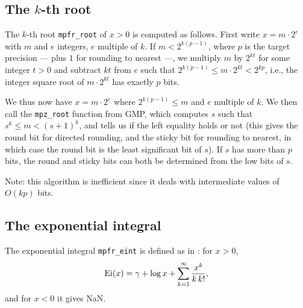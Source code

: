 \documentclass[12pt]{amsart}
\begin{document}
\subsection{The $k$-th root}

The $k$-th root \texttt{mpfr\_root}
of $x > 0$ is computed as follows. First write
$x = m \cdot 2^e$ with $m$ and $e$ integers, $e$ multiple of $k$.
If $m < 2^{k(p-1)}$, where $p$ is the target precision --- plus $1$ for
rounding to nearest ---, we multiply
$m$ by $2^{k t}$ for some integer $t > 0$ and subtract $k t$ from $e$ such that
$2^{k(p-1)} \leq m \cdot 2^{k t} < 2^{kp}$, i.e., the integer square root of
$m \cdot 2^{k t}$ has exactly $p$ bits.

We thus now have $x = m \cdot 2^e$ where $2^{k(p-1)} \leq m$ and $e$
multiple of $k$. We then call the \texttt{mpz\_root} function from GMP,
which computes $s$ such that $s^k \leq m < (s+1)^k$, and tells us if the
left equality holds or not (this gives the round bit for directed rounding,
and the sticky bit for rounding to nearest, in which case the round bit is the
least significant bit of $s$). If $s$ has more than $p$ bits, the round and
sticky bits can both be determined from the low bits of $s$.

Note: this algorithm is inefficient since it deals with intermediate values of
$O(k p)$ bits.

\subsection{The exponential integral}

The exponential integral \verb|mpfr_eint| is defined as in
\cite[formula 5.1.10]{AbSt73}: for $x > 0$,
\[ {\rm Ei}(x) = \gamma + \log x + \sum_{k=1}^{\infty} \frac{x^k}{k \, k!}, \]
and for $x < 0$ it gives NaN.
\end{document}
